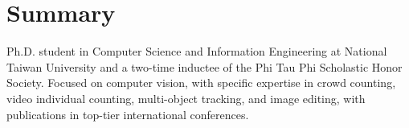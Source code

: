 \section{\textbf{Summary}}
\vspace{1mm}
\begin{justify}
\small{Ph.D. student in Computer Science and Information Engineering at National Taiwan University and a two-time inductee of the Phi Tau Phi Scholastic Honor Society. Focused on computer vision, with specific expertise in crowd counting, video individual counting, multi-object tracking, and image editing, with publications in top-tier international conferences.}
\end{justify}
\vspace{-6mm}
